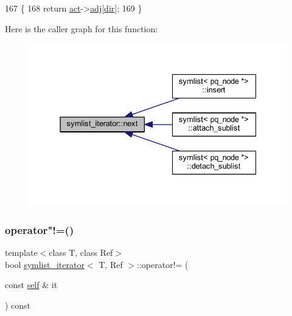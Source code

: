 \begin{DoxyCode}
167     \{
168     \textcolor{keywordflow}{return} \mbox{\hyperlink{structsymlist__iterator_a1c7a0193ab85baa7705070975d841fc8}{act}}->\mbox{\hyperlink{structsymnode_aba7e8f525fb4d85417384a6ccff59241}{adj}}[\mbox{\hyperlink{structsymlist__iterator_a8433e558ceb6b17b225414ef46b4a3e2}{dir}}];
169     \}
\end{DoxyCode}
Here is the caller graph for this function\+:\nopagebreak
\begin{figure}[H]
\begin{center}
\leavevmode
\includegraphics[width=331pt]{structsymlist__iterator_ad363a9756ff599c960668320a93532ed_icgraph}
\end{center}
\end{figure}
\mbox{\label{structsymlist__iterator_ac440e4e4d3f66483a699eebc8ba1ed6e}} 
\subsubsection{\texorpdfstring{operator"!=()}{operator!=()}}
{\footnotesize\ttfamily template$<$class T, class Ref$>$ \\
bool \mbox{\hyperlink{structsymlist__iterator}{symlist\+\_\+iterator}}$<$ T, Ref $>$\+::operator!= (\begin{DoxyParamCaption}\item[{const \mbox{\hyperlink{structsymlist__iterator_ae1426e0085d4c88445c0a84675ee7d38}{self}} \&}]{it }\end{DoxyParamCaption}) const\hspace{0.3cm}{\ttfamily [inline]}}



